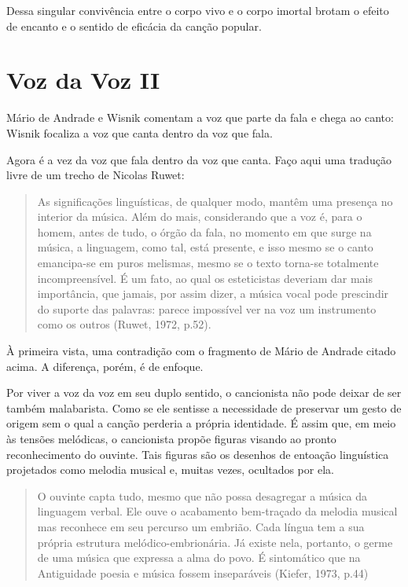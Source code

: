 Dessa singular convivência entre o corpo vivo e o corpo imortal brotam o
efeito de encanto e o sentido de eficácia da canção popular.

\section{Voz da Voz II}

Mário de Andrade e Wisnik comentam a voz que parte da fala e chega ao
canto: Wisnik focaliza a voz que canta dentro da voz que fala.~

Agora é a vez da voz que fala dentro da voz que canta. Faço aqui uma
tradução livre de um trecho de Nicolas Ruwet:

\begin{quote}
As significações linguísticas, de qualquer modo, mantêm uma presença no
interior da música. Além do mais, considerando que a voz é, para o
homem, antes de tudo, o órgão da fala, no momento em que surge na
música, a linguagem, como tal, está presente, e isso mesmo se o canto
emancipa-se em puros melismas, mesmo se o texto torna-se totalmente
incompreensível. É um fato, ao qual os esteticistas deveriam dar mais
importância, que jamais, por assim dizer, a música vocal pode prescindir
do suporte das palavras: parece impossível ver na voz um instrumento
como os outros (Ruwet, 1972, p.52).
\end{quote}

À primeira vista, uma contradição com o fragmento de Mário de Andrade
citado acima. A diferença, porém, é de enfoque.

Por viver a voz da voz em seu duplo sentido, o cancionista não pode
deixar de ser também malabarista. Como se ele sentisse a necessidade de
preservar um gesto de origem sem o qual a canção perderia a própria
identidade. É assim que, em meio às tensões melódicas, o cancionista
propõe figuras visando ao pronto reconhecimento do ouvinte. Tais figuras
são os desenhos de entoação linguística projetados como melodia musical
e, muitas vezes, ocultados por ela.

\begin{quote}
O ouvinte capta tudo, mesmo que não possa desagregar a música da
linguagem verbal. Ele ouve o acabamento bem-traçado da melodia musical
mas reconhece em seu percurso um embrião. Cada língua tem a sua própria
estrutura melódico-embrionária. Já existe nela, portanto, o germe de uma
música que expressa a alma do povo. É sintomático que na Antiguidade
poesia e música fossem inseparáveis (Kiefer, 1973, p.44)
\end{quote}

